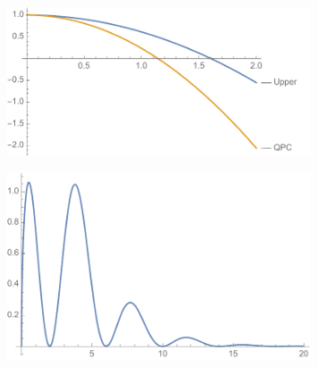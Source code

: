 \documentclass[a4paper]{article}
\begin{document}
\begin{figure}
	\includegraphics[width=0.8\textwidth]{plot_upper_qpc}
\end{figure}	
\begin{figure}
		\includegraphics[width=0.8\textwidth]{highfields}
\end{figure}
\end{document}
